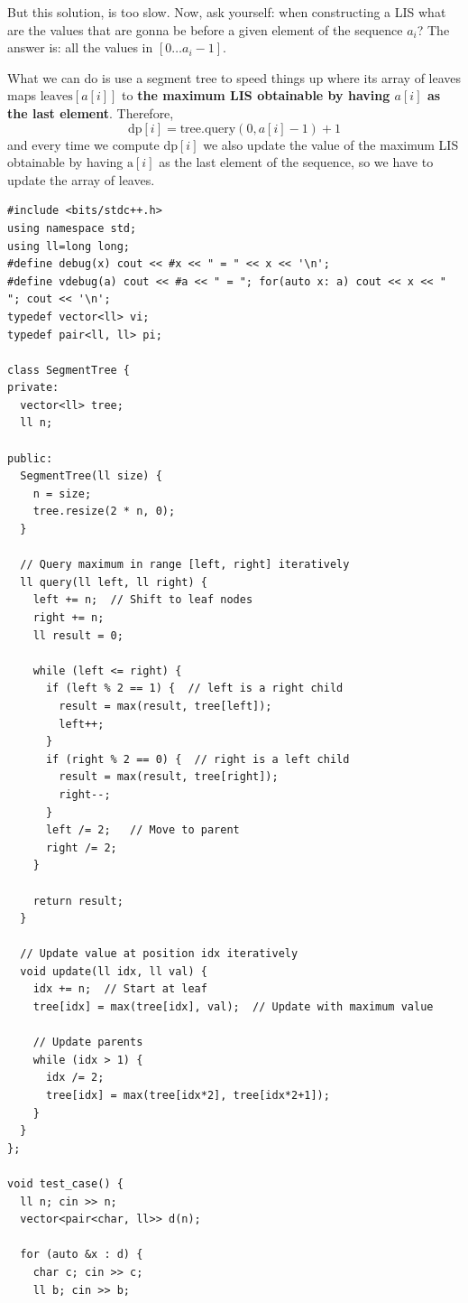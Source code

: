 But this solution, is too slow. Now, ask yourself: when constructing a LIS what are the values that are gonna be before a given element of the sequence $a_i$? The answer is: all the values in $[0 \dots a_i -1 ]$.

What we can do is use a segment tree to speed things up where its array of leaves maps $\text{leaves}[a[i]]$ to \textbf{the maximum LIS obtainable by having $a[i]$ as the last element}. Therefore,
\begin{equation}
    \text{dp}[i] = \text{tree.query}(0 , a[i] -1) + 1
\end{equation}
and every time we compute $\text{dp}[i]$ we also update the value of the maximum LIS obtainable by having $\text{a}[i]$ as the last element of the sequence, so we have to update the array of leaves.

\begin{verbatim}
#include <bits/stdc++.h>
using namespace std;
using ll=long long;
#define debug(x) cout << #x << " = " << x << '\n';
#define vdebug(a) cout << #a << " = "; for(auto x: a) cout << x << " "; cout << '\n';
typedef vector<ll> vi;
typedef pair<ll, ll> pi;

class SegmentTree {
private:
  vector<ll> tree;
  ll n;

public:
  SegmentTree(ll size) {
    n = size;
    tree.resize(2 * n, 0);
  }

  // Query maximum in range [left, right] iteratively
  ll query(ll left, ll right) {
    left += n;  // Shift to leaf nodes
    right += n;
    ll result = 0;
        
    while (left <= right) {
      if (left % 2 == 1) {  // left is a right child
        result = max(result, tree[left]);
        left++;
      }
      if (right % 2 == 0) {  // right is a left child
        result = max(result, tree[right]);
        right--;
      }
      left /= 2;   // Move to parent
      right /= 2;
    }
        
    return result;
  }

  // Update value at position idx iteratively
  void update(ll idx, ll val) {
    idx += n;  // Start at leaf
    tree[idx] = max(tree[idx], val);  // Update with maximum value
        
    // Update parents
    while (idx > 1) {
      idx /= 2;
      tree[idx] = max(tree[idx*2], tree[idx*2+1]);
    }
  }
};

void test_case() {
  ll n; cin >> n;
  vector<pair<char, ll>> d(n);

  for (auto &x : d) {
    char c; cin >> c;
    ll b; cin >> b;


\end{verbatim}
